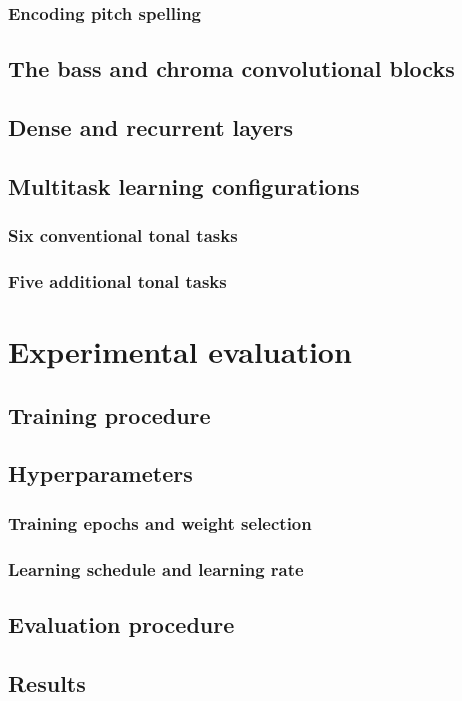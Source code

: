 \documentclass[12pt]{article}
\begin{document}
\subsubsection{Encoding pitch spelling}
\subsection{The bass and chroma convolutional blocks}
\subsection{Dense and recurrent layers}
\subsection{Multitask learning configurations}
\subsubsection{Six conventional tonal tasks}
\subsubsection{Five additional tonal tasks}

\section{Experimental evaluation}
\subsection{Training procedure}
\subsection{Hyperparameters}
\subsubsection{Training epochs and weight selection}
\subsubsection{Learning schedule and learning rate}
\subsection{Evaluation procedure}
\subsection{Results}
\end{document}
